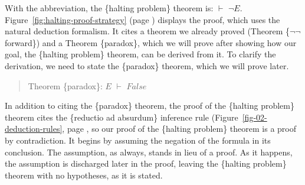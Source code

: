 With the abbreviation, the \{halting problem\} theorem is: $\vdash$ $\neg E$.
Figure~\ref{fig:halting-proof-strategy} (page \pageref{fig:halting-proof-strategy})
displays the proof, which uses the natural deduction formalism.
It cites a theorem we already proved (Theorem \{$\neg \neg$ forward\}) and
a Theorem \{paradox\}, which we will prove
after showing how our goal, the \{halting problem\} theorem,
can be derived from it.
To clarify the derivation, we need to state the \{paradox\} theorem,
which we will prove later.
\begin{quote}
Theorem \{paradox\}: $E$ $\vdash$ $False$
\end{quote}

In addition to citing the \{paradox\} theorem,
the proof of the \{halting problem\} theorem
cites the \{reductio ad absurdum\} inference rule
(Figure~\ref{fig-02-deduction-rules}, page \pageref{fig-02-deduction-rules},
so our proof of the \{halting problem\} theorem is a proof by contradiction.
It begins by assuming the negation of the formula in its conclusion.
The assumption, as always, stands in lieu of a proof.
As it happens, the assumption is discharged later in the proof,
leaving the \{halting problem\} theorem with no hypotheses,
as it is stated.

